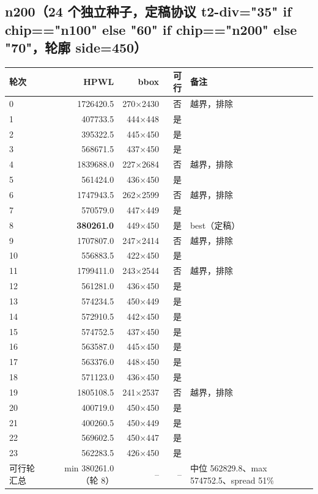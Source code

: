 \documentclass[12pt,a4paper]{article}
\begin{document}
\subsection{n200（24 个独立种子，定稿协议 t2-div={"35" if chip=="n100" else "60" if chip=="n200" else "70"}，轮廓 side=450）}
\begin{table}[H]
\centering
\scriptsize
\setlength{\tabcolsep}{2.5pt}
\begin{tabular}{lrrrl}
\toprule
轮次 & HPWL & bbox & 可行 & 备注 \\
\midrule
0 & 1726420.5 & 270×2430 & 否 & 越界，排除 \\
1 & 407733.5 & 444×448 & 是 &  \\
2 & 395322.5 & 445×450 & 是 &  \\
3 & 568671.5 & 437×450 & 是 &  \\
4 & 1839688.0 & 227×2684 & 否 & 越界，排除 \\
5 & 561424.0 & 436×450 & 是 &  \\
6 & 1747943.5 & 262×2599 & 否 & 越界，排除 \\
7 & 570579.0 & 447×449 & 是 &  \\
8 & \textbf{380261.0} & 449×450 & 是 & best（定稿） \\
9 & 1707807.0 & 247×2414 & 否 & 越界，排除 \\
10 & 556883.5 & 422×450 & 是 &  \\
11 & 1799411.0 & 243×2544 & 否 & 越界，排除 \\
12 & 561281.0 & 436×450 & 是 &  \\
13 & 574234.5 & 450×449 & 是 &  \\
14 & 572910.5 & 442×450 & 是 &  \\
15 & 574752.5 & 437×450 & 是 &  \\
16 & 563587.0 & 445×450 & 是 &  \\
17 & 563376.0 & 448×450 & 是 &  \\
18 & 571123.0 & 436×450 & 是 &  \\
19 & 1805108.5 & 241×2537 & 否 & 越界，排除 \\
20 & 400719.0 & 450×450 & 是 &  \\
21 & 400260.5 & 450×449 & 是 &  \\
22 & 569602.5 & 450×447 & 是 &  \\
23 & 562283.5 & 426×450 & 是 &  \\
\midrule
可行轮汇总 & min 380261.0（轮 8） & -- & -- & 中位 562829.8、max 574752.5、spread 51\% \\
\bottomrule
\end{tabular}
\end{table}
\end{document}
